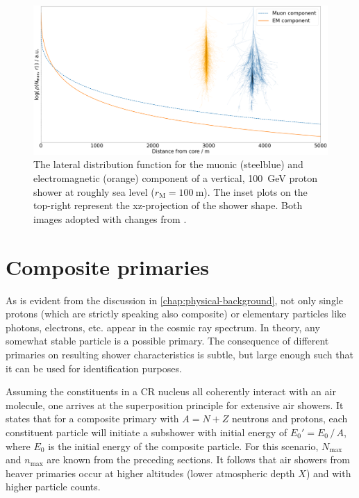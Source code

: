 
\begin{figure}
	\centering
	\includegraphics[width=1.0\textwidth]{./plots/componentwise_LDF.png}
	\caption{The lateral distribution function for the muonic (steelblue) and electromagnetic (orange) component of a vertical, \SI{100}{\giga\electronvolt}
	proton shower at roughly sea level ($r_\text{M}=\SI{100}{\meter}$). The inset plots on the top-right represent the xz-projection of the shower shape. Both 
	images adopted with changes from \cite{CorsikaShower}.}
	\label{fig:component-LDF}
\end{figure}

\section{Composite primaries}
\label{sec:superposition-principle}

As is evident from the discussion in \autoref{chap:physical-background}, not only single protons (which are strictly speaking also composite) or elementary 
particles like photons, electrons, etc. appear in the cosmic ray spectrum. In theory, any somewhat stable particle is a possible primary. The consequence of 
different primaries on resulting shower characteristics is subtle, but large enough such that it can be used for identification purposes.

Assuming the constituents in a CR nucleus all coherently interact with an air molecule, one arrives at the superposition principle for extensive air showers. It 
states that for a composite primary with $A = N + Z$ neutrons and protons, each constituent particle will initiate a subshower with initial energy of 
$E_0' = E_0\,/\,A$, where $E_0$ is the initial energy of the composite particle. For this scenario, $N_\text{max}$ and $n_\text{max}$ are known from the preceding
sections. It follows that air showers from heaver primaries occur at higher altitudes (lower atmospheric depth $X$) and with higher particle counts.

